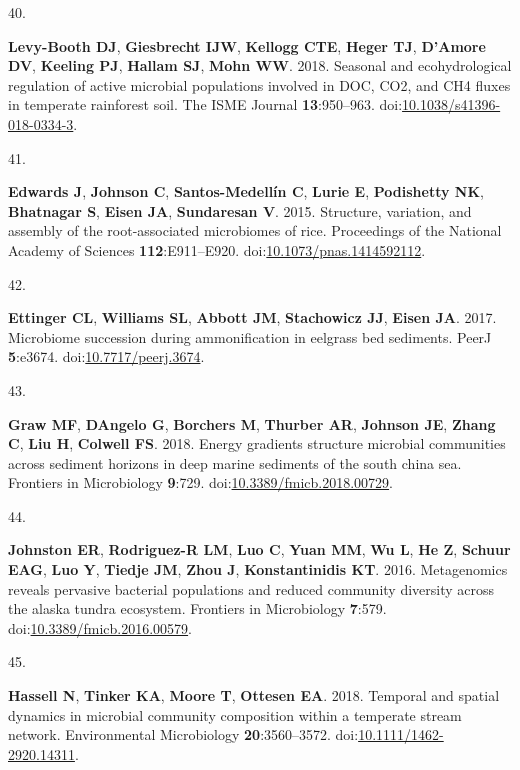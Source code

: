 \documentclass[
]{article}
\newlength{\cslhangindent}
\newlength{\csllabelwidth}
\newlength{\cslentryspacingunit} %
\newenvironment{CSLReferences}[2] %
 {%
  \setlength{\parindent}{0pt}
  \ifodd #1
  \let\oldpar\par
  \def\par{\hangindent=\cslhangindent\oldpar}
  \fi
  \setlength{\parskip}{#2\cslentryspacingunit}
 }%
 {}
\newcommand{\CSLLeftMargin}[1]{\parbox[t]{\csllabelwidth}{#1}}
\newcommand{\CSLRightInline}[1]{\parbox[t]{\linewidth - \csllabelwidth}{#1}\break}
\begin{document}
\begin{CSLReferences}{0}{1}
\leavevmode{}%
\CSLLeftMargin{40. }%
\CSLRightInline{\textbf{Levy-Booth DJ}, \textbf{Giesbrecht IJW},
\textbf{Kellogg CTE}, \textbf{Heger TJ}, \textbf{D'Amore DV},
\textbf{Keeling PJ}, \textbf{Hallam SJ}, \textbf{Mohn WW}. 2018.
Seasonal and ecohydrological regulation of active microbial populations
involved in {DOC}, {CO}2, and {CH}4 fluxes in temperate rainforest soil.
The {ISME} Journal \textbf{13}:950--963.
doi:\href{https://doi.org/10.1038/s41396-018-0334-3}{10.1038/s41396-018-0334-3}.}

\leavevmode{}%
\CSLLeftMargin{41. }%
\CSLRightInline{\textbf{Edwards J}, \textbf{Johnson C},
\textbf{Santos-Medellín C}, \textbf{Lurie E}, \textbf{Podishetty NK},
\textbf{Bhatnagar S}, \textbf{Eisen JA}, \textbf{Sundaresan V}. 2015.
Structure, variation, and assembly of the root-associated microbiomes of
rice. Proceedings of the National Academy of Sciences
\textbf{112}:E911--E920.
doi:\href{https://doi.org/10.1073/pnas.1414592112}{10.1073/pnas.1414592112}.}

\leavevmode{}%
\CSLLeftMargin{42. }%
\CSLRightInline{\textbf{Ettinger CL}, \textbf{Williams SL},
\textbf{Abbott JM}, \textbf{Stachowicz JJ}, \textbf{Eisen JA}. 2017.
Microbiome succession during ammonification in eelgrass bed sediments.
{PeerJ} \textbf{5}:e3674.
doi:\href{https://doi.org/10.7717/peerj.3674}{10.7717/peerj.3674}.}

\leavevmode{}%
\CSLLeftMargin{43. }%
\CSLRightInline{\textbf{Graw MF}, \textbf{DAngelo G}, \textbf{Borchers
M}, \textbf{Thurber AR}, \textbf{Johnson JE}, \textbf{Zhang C},
\textbf{Liu H}, \textbf{Colwell FS}. 2018. Energy gradients structure
microbial communities across sediment horizons in deep marine sediments
of the south china sea. Frontiers in Microbiology \textbf{9}:729.
doi:\href{https://doi.org/10.3389/fmicb.2018.00729}{10.3389/fmicb.2018.00729}.}

\leavevmode{}%
\CSLLeftMargin{44. }%
\CSLRightInline{\textbf{Johnston ER}, \textbf{Rodriguez-R LM},
\textbf{Luo C}, \textbf{Yuan MM}, \textbf{Wu L}, \textbf{He Z},
\textbf{Schuur EAG}, \textbf{Luo Y}, \textbf{Tiedje JM}, \textbf{Zhou
J}, \textbf{Konstantinidis KT}. 2016. Metagenomics reveals pervasive
bacterial populations and reduced community diversity across the alaska
tundra ecosystem. Frontiers in Microbiology \textbf{7}:579.
doi:\href{https://doi.org/10.3389/fmicb.2016.00579}{10.3389/fmicb.2016.00579}.}

\leavevmode{}%
\CSLLeftMargin{45. }%
\CSLRightInline{\textbf{Hassell N}, \textbf{Tinker KA}, \textbf{Moore
T}, \textbf{Ottesen EA}. 2018. Temporal and spatial dynamics in
microbial community composition within a temperate stream network.
Environmental Microbiology \textbf{20}:3560--3572.
doi:\href{https://doi.org/10.1111/1462-2920.14311}{10.1111/1462-2920.14311}.}

\end{CSLReferences}
\end{document}
